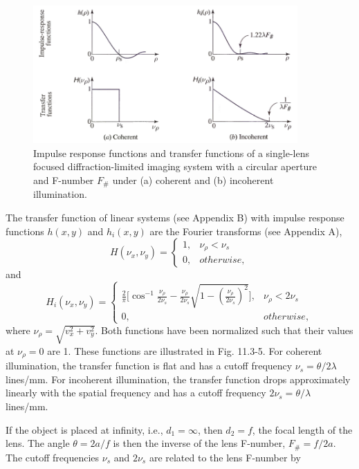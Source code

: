 \documentclass{article}
\numberwithin{figure}{subsection}
\numberwithin{table}{subsection}
\begin{document}
\begin{figure}[H]
\centering
\includegraphics[width=0.9\textwidth]{11_3_5.PNG}
\caption{Impulse response functions and transfer functions of a single-lens focused diffraction-limited imaging system with a circular aperture and F-number $F_\#$ under (a) coherent and (b) incoherent illumination.}
\label{fig: 11_3_5}
\end{figure}
\par The transfer function of linear systems (see Appendix B) with impulse response functions $h(x,y)$ and $h_i (x,y)$ are the Fourier transforms (see Appendix A),
\begin{equation}
H(\nu_x, \nu_y) =
\begin{cases}
1, & \nu_\rho < \nu_s \\
0, & otherwise,
\end{cases}
\end{equation}
and
\begin{equation}
H_i (\nu_x, \nu_y) =
\begin{cases}
\frac{2}{\pi} \Big[\cos^{-1} \frac{\nu_\rho}{2\nu_s} -  \frac{\nu_\rho}{2\nu_s} \sqrt{1 - ( \frac{\nu_\rho}{2\nu_s})^2} \Big], & \nu_\rho < 2\nu_s \\
0, & otherwise,
\end{cases}
\end{equation}
where $\nu_\rho = \sqrt{v_x^2 + v_y^2}$. Both functions have been normalized such that their values at $\nu_\rho = 0$ are 1. These functions are illustrated in Fig. 11.3-5. For coherent illumination, the transfer function is flat and has a cutoff frequency $\nu_s = \theta / 2 \lambda$ lines/mm. For incoherent illumination, the transfer function drops approximately linearly with the spatial frequency and has a cutoff frequency $2\nu_s = \theta / \lambda$ lines/mm.
\par If the object is placed at infinity, i.e., $d_1 = \infty$, then $d_2 = f$, the focal length of the lens. The angle $\theta = 2a / f$ is then  the inverse of the lens F-number, $F_\# = f / 2a$. The cutoff frequencies $\nu_s$ and $2\nu_s$ are related to the lens F-number by
\end{document}
